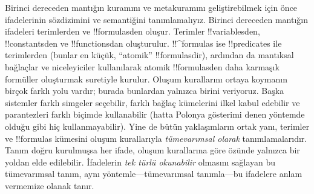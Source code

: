 



Birinci dereceden mantığın kuramını ve metakuramını geliştirebilmek için
önce ifadelerinin sözdizimini ve semantiğini tanımlamalıyız. Birinci
dereceden mantığın ifadeleri terimlerden ve !!{formula}s{}den oluşur.
Terimler !!{variable}s{}den, !!{constant}s{}den ve !!{function}s{}dan
oluşturulur. !!^{formula}s ise !!{predicate}s ile terimlerden (bunlar en
küçük, ``atomik'' !!{formula}s{}dir), ardından da mantıksal
bağlaçlar ve niceleyiciler kullanılarak atomik !!{formula}s{}den daha
karmaşık formüller oluşturmak suretiyle kurulur. Oluşum kurallarını
ortaya koymanın birçok farklı yolu vardır; burada bunlardan yalnızca
birini veriyoruz. Başka sistemler farklı simgeler seçebilir, farklı
bağlaç kümelerini ilkel kabul edebilir ve parantezleri farklı biçimde
kullanabilir (hatta Polonya gösterimi denen yöntemde olduğu gibi hiç
kullanmayabilir). Yine de bütün yaklaşımların ortak yanı, terimler ve
!!{formula}s kümesini oluşum kurallarıyla \emph{tümevarımsal olarak}
tanımlamalarıdır. Tanım doğru kurulmuşsa her ifade, oluşum kurallarına
göre özünde yalnızca bir yoldan elde edilebilir. İfadelerin \emph{tek
türlü okunabilir} olmasını sağlayan bu tümevarımsal tanım, aynı
yöntemle---tümevarımsal tanımla---bu ifadelere anlam vermemize olanak
tanır.

